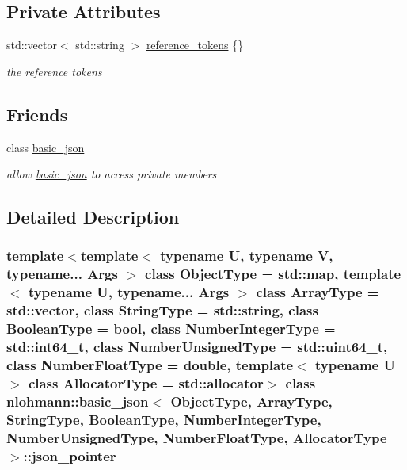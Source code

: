 \subsection*{Private Attributes}
\begin{DoxyCompactItemize}
\item 
\hypertarget{classnlohmann_1_1basic__json_1_1json__pointer_a9c89f0314ddb85e5f40b1189bc3f1616}{}\label{classnlohmann_1_1basic__json_1_1json__pointer_a9c89f0314ddb85e5f40b1189bc3f1616} 
std\+::vector$<$ std\+::string $>$ \hyperlink{classnlohmann_1_1basic__json_1_1json__pointer_a9c89f0314ddb85e5f40b1189bc3f1616}{reference\+\_\+tokens} \{\}
\begin{DoxyCompactList}\small\item\em the reference tokens \end{DoxyCompactList}\end{DoxyCompactItemize}
\subsection*{Friends}
\begin{DoxyCompactItemize}
\item 
\hypertarget{classnlohmann_1_1basic__json_1_1json__pointer_ada3100cdb8700566051828f1355fa745}{}\label{classnlohmann_1_1basic__json_1_1json__pointer_ada3100cdb8700566051828f1355fa745} 
class \hyperlink{classnlohmann_1_1basic__json_1_1json__pointer_ada3100cdb8700566051828f1355fa745}{basic\+\_\+json}
\begin{DoxyCompactList}\small\item\em allow \hyperlink{classnlohmann_1_1basic__json}{basic\+\_\+json} to access private members \end{DoxyCompactList}\end{DoxyCompactItemize}


\subsection{Detailed Description}
\subsubsection*{template$<$template$<$ typename U, typename V, typename... Args $>$ class Object\+Type = std\+::map, template$<$ typename U, typename... Args $>$ class Array\+Type = std\+::vector, class String\+Type = std\+::string, class Boolean\+Type = bool, class Number\+Integer\+Type = std\+::int64\+\_\+t, class Number\+Unsigned\+Type = std\+::uint64\+\_\+t, class Number\+Float\+Type = double, template$<$ typename U $>$ class Allocator\+Type = std\+::allocator$>$\newline
class nlohmann\+::basic\+\_\+json$<$ Object\+Type, Array\+Type, String\+Type, Boolean\+Type, Number\+Integer\+Type, Number\+Unsigned\+Type, Number\+Float\+Type, Allocator\+Type $>$\+::json\+\_\+pointer}

